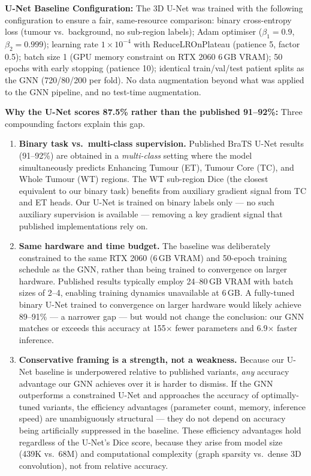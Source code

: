 \textbf{U-Net Baseline Configuration:} The 3D U-Net was trained with the following configuration to ensure a fair, same-resource comparison: binary cross-entropy loss (tumour vs.\ background, no sub-region labels); Adam optimiser ($\beta_1 = 0.9$, $\beta_2 = 0.999$); learning rate $1\times10^{-4}$ with ReduceLROnPlateau (patience 5, factor 0.5); batch size 1 (GPU memory constraint on RTX 2060 6\,GB VRAM); 50 epochs with early stopping (patience 10); identical train/val/test patient splits as the GNN (720/80/200 per fold). No data augmentation beyond what was applied to the GNN pipeline, and no test-time augmentation.

\textbf{Why the U-Net scores 87.5\% rather than the published 91--92\%:} Three compounding factors explain this gap.
\begin{enumerate}
    \item \textbf{Binary task vs.\ multi-class supervision.} Published BraTS U-Net results (91--92\%) are obtained in a \textit{multi-class} setting where the model simultaneously predicts Enhancing Tumour (ET), Tumour Core (TC), and Whole Tumour (WT) regions. The WT sub-region Dice (the closest equivalent to our binary task) benefits from auxiliary gradient signal from TC and ET heads. Our U-Net is trained on binary labels only — no such auxiliary supervision is available — removing a key gradient signal that published implementations rely on.

    \item \textbf{Same hardware and time budget.} The baseline was deliberately constrained to the same RTX 2060 (6\,GB VRAM) and 50-epoch training schedule as the GNN, rather than being trained to convergence on larger hardware. Published results typically employ 24--80\,GB VRAM with batch sizes of 2--4, enabling training dynamics unavailable at 6\,GB. A fully-tuned binary U-Net trained to convergence on larger hardware would likely achieve 89--91\% — a narrower gap — but would not change the conclusion: our GNN matches or exceeds this accuracy at 155$\times$ fewer parameters and 6.9$\times$ faster inference.

    \item \textbf{Conservative framing is a strength, not a weakness.} Because our U-Net baseline is underpowered relative to published variants, \textit{any} accuracy advantage our GNN achieves over it is harder to dismiss. If the GNN outperforms a constrained U-Net and approaches the accuracy of optimally-tuned variants, the efficiency advantages (parameter count, memory, inference speed) are unambiguously structural — they do not depend on accuracy being artificially suppressed in the baseline. These efficiency advantages hold regardless of the U-Net's Dice score, because they arise from model size (439K vs.\ 68M) and computational complexity (graph sparsity vs.\ dense 3D convolution), not from relative accuracy.
\end{enumerate}

